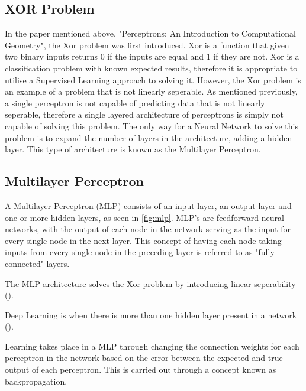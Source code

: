 \documentclass[12pt]{report}
\begin{document}
\subsection{XOR Problem}
\begin{flushleft}
In the paper mentioned above, "Perceptrons: An Introduction to Computational Geometry", the Xor problem was first introduced. Xor is a function that given two binary inputs returns 0 if the inputs are equal and 1 if they are not. Xor is a classification problem with known expected results, therefore it is appropriate to utilise a Supervised Learning approach to solving it. However, the Xor problem is an example of a problem that is not linearly seperable. As mentioned previously, a single perceptron is not capable of predicting data that is not linearly seperable, therefore a single layered architecture of perceptrons is simply not capable of solving this problem. The only way for a Neural Network to solve this problem is to expand the number of layers in the architecture, adding a hidden layer. This type of architecture is known as the Multilayer Perceptron.
\end{flushleft}

\subsection{Multilayer Perceptron}
\begin{flushleft}
A Multilayer Perceptron (MLP) consists of an input layer, an output layer and one or more hidden layers, as seen in \ref{fig:mlp}. MLP's are feedforward neural networks, with the output of each node in the network serving as the input for every single node in the next layer. This concept of having each node taking inputs from every single node in the preceding layer is referred to as "fully-connected" layers.

 The MLP architecture solves the Xor problem by introducing linear seperability (\cite{Singh2016MinimumCM}).

Deep Learning is when there is more than one hidden layer present in a network (\cite{o2015introduction}). 

Learning takes place in a MLP through changing the connection weights for each perceptron in the network based on the error between the expected and true output of each perceptron. This is carried out through a concept known as backpropagation.
\end{flushleft}
\end{document}
